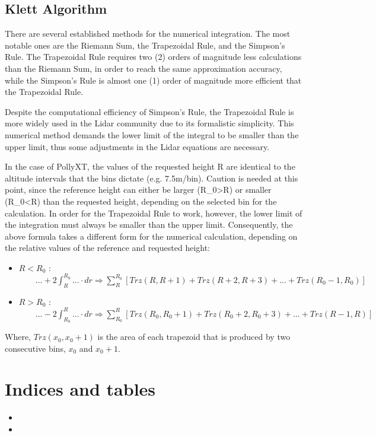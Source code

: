 \documentclass[letterpaper,10pt,english]{sphinxmanual}
\begin{document}
\section{Klett Algorithm}
\label{klett_notes:klett-algorithm}
There are several established methods for the numerical integration. The most notable ones are the Riemann Sum, the Trapezoidal Rule, and the Simpson’s Rule. The Trapezoidal Rule requires two (2) orders of magnitude less calculations than the Riemann Sum, in order to reach the same approximation accuracy, while the Simpson’s Rule is almost one (1) order of magnitude more efficient that the Trapezoidal Rule.

Despite the computational efficiency of Simpson’s Rule, the Trapezoidal Rule is more widely used in the Lidar community due to its formalistic simplicity. This numerical method demands the lower limit of the integral to be smaller than the upper limit, thus some adjustments in the Lidar equations are necessary.

In the case of PollyXT, the values of the requested height R are identical to the altitude intervals that the bins dictate (e.g. 7.5m/bin). Caution is needed at this point, since the reference height can either be larger (R\_0\textgreater{}R) or smaller (R\_0\textless{}R) than the requested height, depending on the selected bin for the calculation. In order for the Trapezoidal Rule to work, however, the lower limit of the integration must always be smaller than the upper limit.
Consequently, the above formula takes a different form for the numerical calculation, depending on the relative values of the reference and requested height:
\begin{itemize}
\item {} 
\(R<R_0\) :    \(\qquad ... +2 \int_{R}^{R_0}... \cdot dr \Rightarrow \sum_{R}^{R_{0}}[Trz(R,R+1)+Trz(R+2,R+3)+...+Trz(R_0-1,R_0)]\)

\item {} 
\(R>R_0\) :    \(\qquad ... -2 \int_{R_0}^{R}... \cdot dr \Rightarrow \sum_{R_0}^{R}[Trz(R_0,R_0+1)+Trz(R_0+2,R_0+3)+...+Trz(R-1,R)]\)

\end{itemize}

Where, \(Trz(x_0,x_0+1)\) is the area of each trapezoid that is produced by two consecutive bins, \(x_0\) and \(x_0+1\).


\chapter{Indices and tables}
\label{index:indices-and-tables}\begin{itemize}
\item {} 

\item {} 

\end{itemize}
\end{document}
